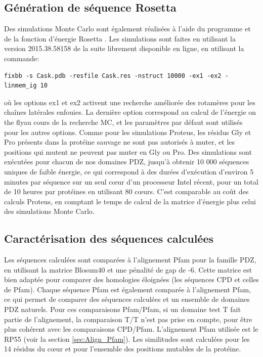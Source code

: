 \subsection{Génération de séquence Rosetta}

Des simulations Monte Carlo sont également réalisées à l'aide du programme et de la fonction d'énergie Rosetta \cite{Baker06}. Les simulations sont faites en utilisant la version 2015.38.58158 de la suite librement disponible en ligne, en utilisant la commande:
\begin{verbatim}
fixbb -s Cask.pdb -resfile Cask.res -nstruct 10000 -ex1 -ex2 -linmem_ig 10
\end{verbatim} 
où les options ex1 et ex2 activent une recherche améliorée des rotamères pour les chaînes latérales enfouies. La dernière option correspond au calcul de l'énergie \og on the fly\fg au cours de la recherche MC, et les paramètres par défaut sont utilisés pour les autres options. Comme pour les simulations Proteus, les résidus Gly et Pro présents dans la protéine sauvage ne sont pas autorisés à muter, et les positions qui mutent ne peuvent pas muter en Gly ou Pro. Des simulations sont exécutées pour chacun de nos domaines PDZ, jusqu'à obtenir 10 000 séquences uniques de faible énergie, ce qui correspond à des durées d'exécution d'environ 5 minutes par séquence sur un seul cœur d'un processeur Intel récent, pour un total de 10 heures par protéines en utilisant 80 cœurs. C'est comparable au coût des calculs Proteus, en comptant le temps de calcul de la matrice d'énergie plus celui des simulations Monte Carlo.

\subsection{Caractérisation des séquences calculées}

Les séquences calculées sont comparées à l'alignement Pfam pour la famille PDZ, en utilisant la matrice Blosum40 et une pénalité de gap de -6. Cette matrice est bien adaptée pour comparer des homologies éloignées (les séquences CPD et celles de Pfam). Chaque séquence Pfam est également comparée à l'alignement Pfam, ce qui permet de comparer des séquences calculées et un ensemble de domaines PDZ naturels. Pour ces comparaisons Pfam/Pfam, si un domaine test T fait partie de l'alignement, la comparaison T/T n'est pas prise en compte, pour être plus cohérent avec les comparaisons CPD/Pfam. L'alignement Pfam utilisée est le \og RP55 \fg (voir la section \ref{sec:Align_Pfam}). Les similitudes sont calculées pour les 14 résidus du cœur et pour l'ensemble des positions mutables de la protéine.

